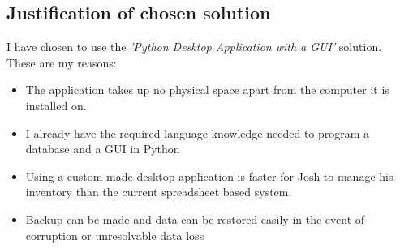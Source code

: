 \subsection{Justification of chosen solution}


I have chosen to use the \emph{'Python Desktop Application with a GUI'} solution. \\

\noindent These are my reasons:

\begin{itemize}
    \item The application takes up no physical space apart from the computer it is installed on.
    \item I already have the required language knowledge needed to program a database and a GUI in Python
    \item Using a custom made desktop application is faster for Josh to manage his inventory than the current spreadsheet based system.
    \item Backup can be made and data can be restored easily in the event of corruption or unresolvable data loss
\end{itemize}
